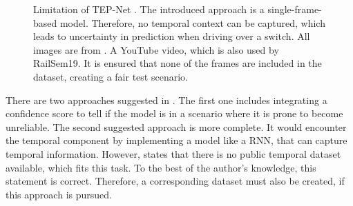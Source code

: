 \begin{figure}[H]
    \begin{minipage}{1.0\textwidth}
        \centering
    \end{minipage}

    \vspace{0.5cm}
    \caption{Limitation of \ac{TEP}-Net \cite{tepNet2024}. The introduced approach is a single-frame-based model. Therefore, no temporal context can be captured, which leads to uncertainty in prediction when driving over a switch.
    All images are from \cite{limitaion_youtube_video}. A YouTube video, which is also used by RailSem19. It is ensured that none of the frames are included in the dataset, creating a fair test scenario.}
    \label{fig:limitationSwitch}
\end{figure}

There are two approaches suggested in \cite{tepNet2024}.
The first one includes integrating a confidence score to tell if the model is in a scenario where it is prone to become unreliable.
The second suggested approach is more complete.
It would encounter the temporal component by implementing a model like a \ac{RNN}, that can capture temporal information.
However, \cite{tepNet2024} states that there is no public temporal dataset available, which fits this task.
To the best of the author's knowledge, this statement is correct.
Therefore, a corresponding dataset must also be created, if this approach is pursued.